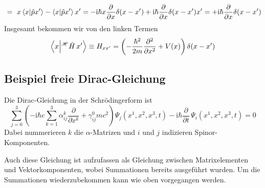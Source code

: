 \documentclass[12pt]{article}
\begin{document}
\begin{equation*}
\ =\ x \bra{x}\ket{\hat{p}x'} - \bra{x}\ket{\hat{p}x'} x'
= -\mathrm {i} \hbar x \frac{\partial }{\partial x}\delta(x-x')
+\mathrm{i} \hbar \frac{\partial }{\partial x}\delta(x-x') x'
= +\mathrm{i} \hbar \frac{\partial }{\partial x}\delta(x-x')
\end{equation*}
Insgesamt bekommen wir von den linken Termen 
\begin{equation*}
\bra{x}\ket{^\mathscr{H}\hat{H}\,x'}\equiv H_{xx'} = 
\left(-\frac{\hbar^2}{2m} \frac {\partial^2}{\partial x^2}+V(x)\right) \delta(x-x')
\end{equation*}

\subsection{Beispiel freie Dirac-Gleichung}
Die Dirac-Gleichung in der Schrödingerform ist
\begin{equation*}
\sum_{j=0}^{3}\left(-\mathrm{i}\hbar c \sum_{k=1}^{3}\alpha^{k}_{ij}\frac{\partial }{\partial x^k}+\gamma^{0}_{ij} m c^2 \right)\Psi_j(x^1,x^2,x^3,t) 
- {\mathrm i}\hbar{\frac  {\partial }{\partial t}}\,\Psi_i(x^1,x^2,x^3,t) = 0
\end{equation*}
Dabei nummerieren $k$ die $\alpha$-Matrizen und $i$ und $j$ indizieren Spinor-Komponenten.

Auch diese Gleichung ist aufzufassen als Gleichung zwischen Matrixelementen und Vektorkomponenten, wobei Summationen bereits ausgeführt wurden. Um die Summationen wiederzubekommen kann wie oben vorgegangen werden. 
\end{document}
